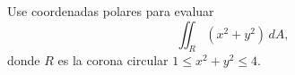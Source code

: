 Use coordenadas polares para evaluar
\[
\iint_R(x^2+y^2)\,dA,
\]
donde $R$ es la corona circular $1\leq x^2+y^2\leq4$.

